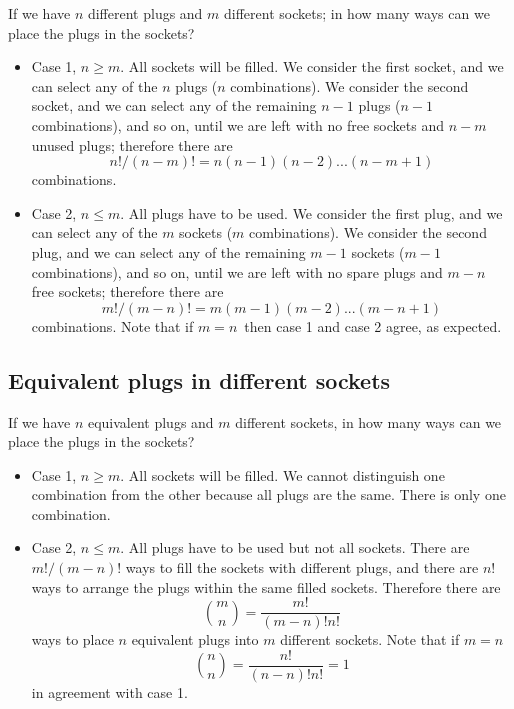 \documentclass[justified,sixbynine]{tufte-book}
\theoremstyle{plain}%
\theoremstyle{definition}
\theoremstyle{remark}
\begin{document}
\begin{fullwidth}
If we have $n$ different plugs and $m$ different sockets; in how many ways
can we place the plugs in the sockets?

\begin{itemize}
\item  Case 1, $n\geq m$. All sockets will be filled. We consider the first
socket, and we can select any of the $n$ plugs ($n$ combinations). We
consider the second socket, and we can select any of the remaining $n-1$
plugs ($n-1$ combinations), and so on, until we are left with no free sockets
and $n-m$ unused plugs; therefore there are
\begin{equation}
n!/(n-m)!=n(n-1)(n-2)...(n-m+1)
\end{equation}
combinations.

\item  Case 2, $n\leq m$. All plugs have to be used. We consider the first
plug, and we can select any of the $m$ sockets ($m$ combinations). We
consider the second plug, and we can select any of the remaining $m-1$
sockets ($m-1$ combinations), and so on, until we are left with no spare
plugs and $m-n$ free sockets; therefore there are
\begin{equation}
m!/(m-n)!=m(m-1)(m-2)...(m-n+1)
\end{equation}
combinations. Note that if $m=n\,$ then case 1 and case 2 agree, as
expected.
\end{itemize}

\goodbreak\subsection{Equivalent plugs in different sockets}

If we have $n$ equivalent plugs and $m$ different sockets, in how many ways
can we place the plugs in the sockets?

\begin{itemize}
\item  Case 1, $n\geq m$. All sockets will be filled. We cannot distinguish
one combination from the other because all plugs are the same. There is only
one combination.

\item  Case 2, $n\leq m$. All plugs have to be used but not all sockets.
There are $m!/(m-n)!$ ways to fill the sockets with different plugs, and
there are $n!$ ways to arrange the plugs within the same filled sockets.
Therefore there are
\begin{equation}
\binom mn=\frac{m!}{(m-n)!n!}
\end{equation}
ways to place $n$ equivalent plugs into $m$ different sockets. Note that if $%
m=n$%
\begin{equation}
\binom nn=\frac{n!}{(n-n)!n!}=1
\end{equation}
in agreement with case 1.
\end{itemize}


\end{fullwidth}
\end{document}
